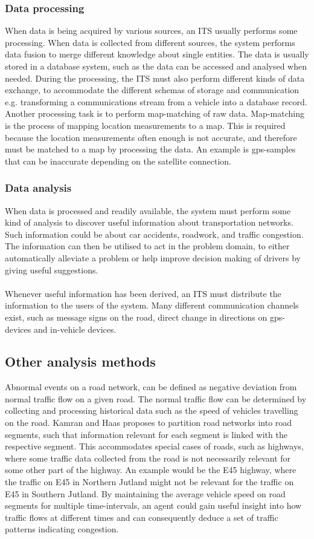 \subsubsection*{Data processing}
When data is being acquired by various sources, an ITS usually performs some processing. When data is collected from different sources, the system performs data fusion to merge different knowledge about single entities. The data is usually stored in a database system, such as the data can be accessed and analysed when needed. During the processing, the ITS must also perform different kinds of data exchange, to accommodate the different schemas of storage and communication e.g. transforming a communications stream from a vehicle into a database record.\\ 
Another processing task is to perform map-matching of raw data. Map-matching is the process of mapping location measurements to a map. This is required because the location measurements often enough is not accurate, and therefore must be matched to a map by processing the data. An example is gps-samples that can be inaccurate depending on the satellite connection.

\subsubsection*{Data analysis}
When data is processed and readily available, the system must perform some kind of analysis to discover useful information about transportation networks. Such information could be about car accidents, roadwork, and traffic congestion. The information can then be utilised to act in the problem domain, to either automatically alleviate a problem or help improve decision making of drivers by giving useful suggestions.
\\\\
Whenever useful information has been derived, an ITS must distribute the information to the users of the system. Many different communication channels exist, such as message signs on the road, direct change in directions on gps-devices and in-vehicle devices.

\subsection{Other analysis methods}
Abnormal events on a road network, can be defined as negative deviation from normal traffic flow on a given road. The normal traffic flow can be determined by collecting and processing historical data such as the speed of vehicles travelling on the road. Kamran and Haas\cite{KamranHaas2007} proposes to partition road networks into road segments, such that information relevant for each segment is linked with the respective segment. This accommodates special cases of roads, such as highways, where some traffic data collected from the road is not necessarily relevant for some other part of the highway. An example would be the E45 highway, where the traffic on E45 in Northern Jutland might not be relevant for the traffic on E45 in Southern Jutland. By maintaining the average vehicle speed on road segments for multiple time-intervals, an agent could gain useful insight into how traffic flows at different times and can consequently deduce a set of traffic patterns indicating congestion.